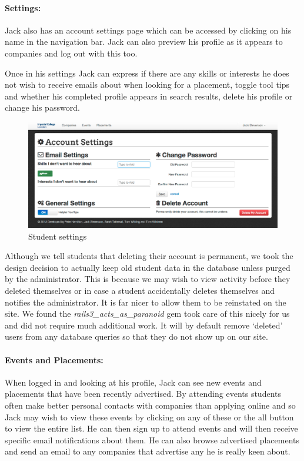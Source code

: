   \paragraph{Settings:}
    Jack also has an account settings page which can be accessed by clicking on his name in the navigation bar. Jack can also preview his profile as it appears to companies and log out with this too. 

    Once in his settings Jack can express if there are any skills or interests he does not wish to receive emails about when looking for a placement, toggle tool tips and whether his completed profile appears in search results, delete his profile or change his password.

    \begin{figure}[H]\centering
    \includegraphics[scale=0.3]{images/user_experiences/student/account_settings}
    \caption{Student settings}
    \end{figure}

    Although we tell students that deleting their account is permanent, we took the design decision to actually keep old student data in the database unless purged by the administrator. This is because we may wish to view activity before they deleted themselves or in case a student accidentally deletes themselves and notifies the administrator. It is far nicer to allow them to be reinstated on the site. We found the \textit{rails3\_acts\_as\_paranoid}\cite{paranoid_gem} gem took care of this nicely for us and did not require much additional work. It will by default remove `deleted' users from any database queries so that they do not show up on our site.

  \paragraph{Events and Placements:}
    When logged in and looking at his profile, Jack can see new events and placements that have been recently advertised. By attending events students often make better personal contacts with companies than applying online and so Jack may wish to view these events by clicking on any of these or the all button to view the entire list. He can then sign up to attend events and will then receive specific email notifications about them.
    He can also browse advertised placements and send an email to any companies that advertise any he is really keen about.

